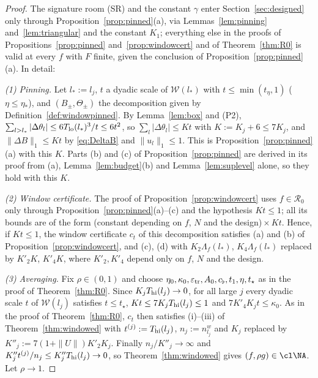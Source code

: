 \begin{proof}
The signature room (SR) and the constant $\gamma$ enter
Section~\ref{sec:designed} only through Proposition~\ref{prop:pinned}(a),
via Lemmas~\ref{lem:pinning} and~\ref{lem:triangular} and the constant
$K_1$; everything else in the proofs of Propositions~\ref{prop:pinned}
and~\ref{prop:windowcert} and of Theorem~\ref{thm:R0} is valid at every
$f$ with $F$ finite, given the conclusion of
Proposition~\ref{prop:pinned}(a).  In detail:

\emph{(1) Pinning.}  Let $l_*:=l_j$, $t$ a dyadic scale of
$\mathcal W(l_*)$ with $t\le\min(t_\eta,1)$ ($\eta\le\eta_*$), and
$(B_\pm,\Theta_\pm)$ the decomposition given by
Definition~\ref{def:windowpinned}.  By Lemma~\ref{lem:box} and (P2),
$\sum_{l>l_*}|\Delta\theta_l|\le6T_{\rm lo}(l_*)^3/t\le6t^2$, so
$\sum_l|\Delta\theta_l|\le Kt$ with $K:=K_j+6\le7K_j$, and
$\|\Delta B\|_1\le Kt$ by \eqref{eq:DeltaB} and $\|u_l\|_1\le1$.  This is
Proposition~\ref{prop:pinned}(a) with this $K$.  Parts (b) and (c) of
Proposition~\ref{prop:pinned} are derived in its proof from (a),
Lemma~\ref{lem:budget}(b) and Lemma~\ref{lem:suplevel} alone, so they hold
with this $K$.

\emph{(2) Window certificate.}  The proof of
Proposition~\ref{prop:windowcert} uses $f\in\mathcal R_0$ only through
Proposition~\ref{prop:pinned}(a)--(c) and the hypothesis $Kt\le1$; all its
bounds are of the form (constant depending on $f$, $N$ and the
design)${}\times Kt$.  Hence, if $Kt\le1$, the window certificate $c_t$ of
this decomposition satisfies (a) and (b) of
Proposition~\ref{prop:windowcert}, and (c), (d) with $K_2\Lambda_f(l_*)$,
$K_4\Lambda_f(l_*)$ replaced by $K'_2K$, $K'_4K$, where $K'_2,K'_4$ depend
only on $f$, $N$ and the design.

\emph{(3) Averaging.}  Fix $\rho\in(0,1)$ and choose $\eta_0,\kappa_0,
\varepsilon_{\rm tr},A_0,c_\flat,t_1,\eta,t_\star$ as in the proof of
Theorem~\ref{thm:R0}.  Since $K_jT_{\rm hi}(l_j)\to0$, for all large $j$
every dyadic scale $t$ of $\mathcal W(l_j)$ satisfies $t\le t_\star$,
$Kt\le7K_jT_{\rm hi}(l_j)\le1$ and $7K'_4K_jt\le\kappa_0$.  As in the proof
of Theorem~\ref{thm:R0}, $c_t$ then satisfies (i)--(iii) of
Theorem~\ref{thm:windowed} with $t^{(j)}:=T_{\rm hi}(l_j)$,
$n_j:=n^w_{l_j}$ and $K_j$ replaced by $K''_j:=7(1+\|U\|)K'_2K_j$.  Finally
$n_j/K''_j\to\infty$ and $K''_jt^{(j)}/n_j\le K''_jT_{\rm hi}(l_j)\to0$, so
Theorem~\ref{thm:windowed} gives $(f,\rho g)\in\cl\NA$.  Let $\rho\to1$.
\end{proof}

